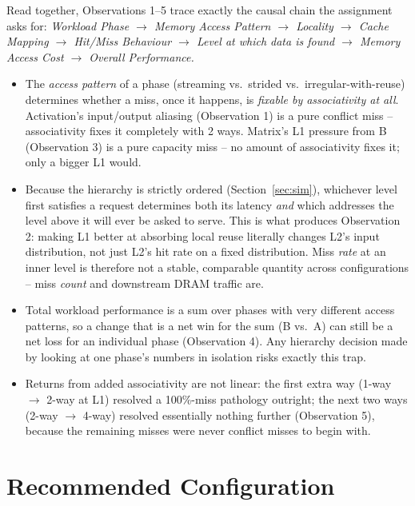 \documentclass[11pt]{article}
\begin{document}
Read together, Observations 1--5 trace exactly the causal chain the
assignment asks for: \emph{Workload Phase $\to$ Memory Access Pattern
$\to$ Locality $\to$ Cache Mapping $\to$ Hit/Miss Behaviour $\to$ Level at
which data is found $\to$ Memory Access Cost $\to$ Overall Performance.}

\begin{itemize}[leftmargin=1.6em]
\item The \emph{access pattern} of a phase (streaming vs.\ strided vs.\
      irregular-with-reuse) determines whether a miss, once it happens, is
      \emph{fixable by associativity at all}. Activation's
      input/output aliasing (Observation 1) is a pure conflict miss --
      associativity fixes it completely with 2 ways. Matrix's L1 pressure
      from B (Observation 3) is a pure capacity miss -- no amount of
      associativity fixes it; only a bigger L1 would.
\item Because the hierarchy is strictly ordered (Section~\ref{sec:sim}),
      whichever level first satisfies a request determines both its
      latency \emph{and} which addresses the level above it will ever be
      asked to serve. This is what produces Observation 2: making L1
      better at absorbing local reuse literally changes L2's input
      distribution, not just L2's hit rate on a fixed distribution. Miss
      \emph{rate} at an inner level is therefore not a stable, comparable
      quantity across configurations -- miss \emph{count} and downstream
      DRAM traffic are.
\item Total workload performance is a sum over phases with very different
      access patterns, so a change that is a net win for the sum (B vs.\
      A) can still be a net loss for an individual phase (Observation 4).
      Any hierarchy decision made by looking at one phase's numbers in
      isolation risks exactly this trap.
\item Returns from added associativity are not linear: the first extra
      way (1-way $\to$ 2-way at L1) resolved a 100\%-miss pathology
      outright; the next two ways (2-way $\to$ 4-way) resolved essentially
      nothing further (Observation 5), because the remaining misses were
      never conflict misses to begin with.
\end{itemize}

\section{Recommended Configuration}
\end{document}
